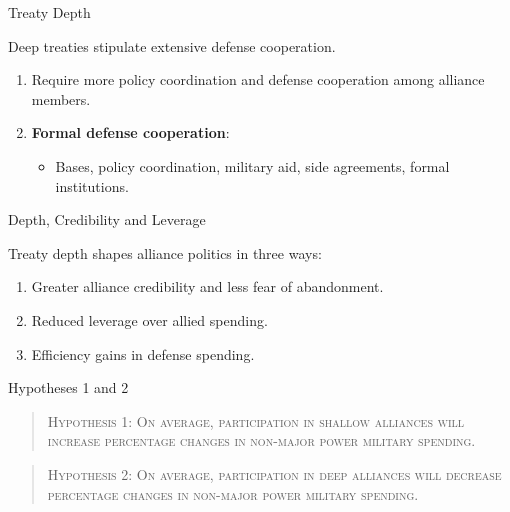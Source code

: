 \documentclass[12pt]{beamer}
\begin{document}
\begin{frame}{Treaty Depth}

\pause 
Deep treaties stipulate extensive defense cooperation. 

\begin{enumerate} 
\pause
\item Require more policy coordination and defense cooperation among alliance members. 
\item \textbf{Formal defense cooperation}:
\pause
\begin{itemize}
\item Bases, policy coordination, military aid, side agreements, formal institutions. 
\end{itemize}  
\end{enumerate}  

\end{frame}



\begin{frame}{Depth, Credibility and Leverage}

Treaty depth shapes alliance politics in three ways: 

\begin{enumerate}
\pause
\item Greater alliance credibility and less fear of abandonment.   
\pause
\item Reduced leverage over allied spending.
\pause
\item Efficiency gains in defense spending. 
\end{enumerate}

\end{frame}



\begin{frame}{Hypotheses 1 and 2} 

\begin{quote}
\textsc{Hypothesis 1: On average, participation in shallow alliances will increase percentage changes in non-major power military spending.}
\end{quote}
\pause

\begin{quote}
\textsc{Hypothesis 2: On average, participation in deep alliances will decrease percentage changes in non-major power military spending.}
\end{quote}

\end{frame}
\end{document}
